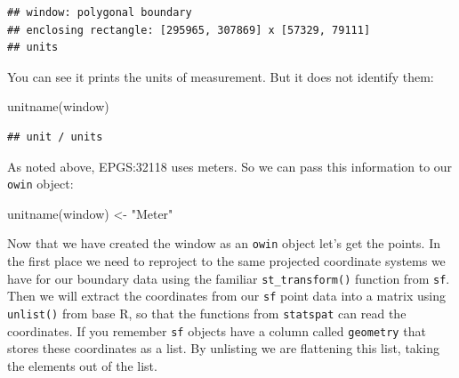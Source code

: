 \documentclass[
  krantz2]{krantz}
\makeatletter
\newenvironment{Shaded}{\begin{snugshade}}{\end{snugshade}}
\newcommand{\AttributeTok}[1]{\textcolor[rgb]{0.61,0.61,0.61}{#1}}
\newcommand{\CommentTok}[1]{\textcolor[rgb]{0.37,0.37,0.37}{\textit{#1}}}
\newcommand{\DecValTok}[1]{\textcolor[rgb]{0.06,0.06,0.06}{#1}}
\newcommand{\FunctionTok}[1]{\textcolor[rgb]{0,0,0}{#1}}
\newcommand{\NormalTok}[1]{#1}
\newcommand{\OtherTok}[1]{\textcolor[rgb]{0.37,0.37,0.37}{#1}}
\newcommand{\SpecialCharTok}[1]{\textcolor[rgb]{0,0,0}{#1}}
\newcommand{\StringTok}[1]{\textcolor[rgb]{0.5,0.5,0.5}{#1}}
\newenvironment{kframe}{%
\medskip{}
\setlength{\fboxsep}{.8em}
 \def\at@end@of@kframe{}%
 \ifinner\ifhmode%
  \def\at@end@of@kframe{\end{minipage}}%
  \begin{minipage}{\columnwidth}%
 \fi\fi%
 \def\FrameCommand##1{\hskip\@totalleftmargin \hskip-\fboxsep
 \colorbox{shadecolor}{##1}\hskip-\fboxsep
     \hskip-\linewidth \hskip-\@totalleftmargin \hskip\columnwidth}%
 \MakeFramed {\advance\hsize-\width
   \@totalleftmargin\z@ \linewidth\hsize
   \@setminipage}}%
 {\par\unskip\endMakeFramed%
 \at@end@of@kframe}
\renewenvironment{Shaded}{\begin{kframe}}{\end{kframe}}
\makeatother
\begin{document}
\begin{verbatim}
## window: polygonal boundary
## enclosing rectangle: [295965, 307869] x [57329, 79111] 
## units
\end{verbatim}

You can see it prints the units of measurement. But it does not identify them:

\begin{Shaded}
\begin{Highlighting}[]
\FunctionTok{unitname}\NormalTok{(window)}
\end{Highlighting}
\end{Shaded}

\begin{verbatim}
## unit / units
\end{verbatim}

As noted above, EPGS:32118 uses meters. So we can pass this information to our \texttt{owin} object:

\begin{Shaded}
\begin{Highlighting}[]
\FunctionTok{unitname}\NormalTok{(window) }\OtherTok{\textless{}{-}} \StringTok{"Meter"}
\end{Highlighting}
\end{Shaded}

Now that we have created the window as an \texttt{owin} object let's get the points. In the first place we need to reproject to the same projected coordinate systems we have for our boundary data using the familiar \texttt{st\_transform()} function from \texttt{sf}. Then we will extract the coordinates from our \texttt{sf} point data into a matrix using \texttt{unlist()} from base R, so that the functions from \texttt{statspat} can read the coordinates. If you remember \texttt{sf} objects have a column called \texttt{geometry} that stores these coordinates as a list. By unlisting we are flattening this list, taking the elements out of the list.

\begin{Shaded}
\end{Shaded}
\end{document}
